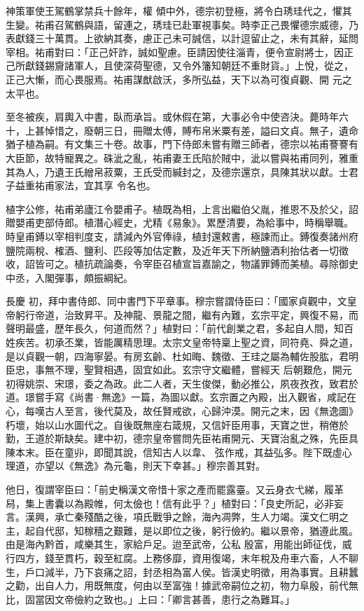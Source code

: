 \begin{pinyinscope}
 神策軍使王駕鶴掌禁兵十餘年，權
 傾中外，德宗初登極，將令白琇珪代之，懼其生變。祐甫召駕鶴與語，留連之，琇珪已赴軍視事矣。時李正己畏懼德宗威德，乃表獻錢三十萬貫。上欲納其奏，慮正己未可誠信，以計逗留止之，未有其辭，延問宰相。祐甫對曰：「正己奸詐，誠如聖慮。臣請因使往淄青，便令宣尉將士，因正己所獻錢錫齎諸軍人，且使深荷聖德，又令外籓知朝廷不重財貨。」上悅，從之，正己大慚，而心畏服焉。祐甫謀猷啟沃，多所弘益，天下以為可復貞觀、開
 元之太平也。



 至冬被疾，肩輿入中書，臥而承旨。或休假在第，大事必令中使咨決。薨時年六十，上甚悼惜之，廢朝三日，冊贈太傅，賻布帛米粟有差，謚曰文貞。無子，遺命猶子植為嗣。有文集三十卷。故事，門下侍郎未嘗有贈三師者，德宗以祐甫謇謇有大臣節，故特寵異之。硃泚之亂，祐甫妻王氏陷於賊中，泚以嘗與祐甫同列，雅重其為人，乃遺王氏繒帛菽粟，王氏受而緘封之，及德宗還京，具陳其狀以獻。士君子益重祐甫家法，宜其享
 令名也。



 植字公修，祐甫弟廬江令嬰甫子。植既為相，上言出繼伯父胤，推恩不及於父，詔贈嬰甫吏部侍郎。植潛心經史，尤精《易象》。累歷清要，為給事中，時稱舉職。時皇甫鎛以宰相判度支，請減內外官俸祿，植封還敕書，極諫而止。鎛復奏諸州府鹽院兩稅、榷酒、鹽利、匹段等加估定數，及近年天下所納鹽酒利抬估者一切徵收，詔皆可之。植抗疏論奏，令宰臣召植宣旨嘉諭之，物議罪鎛而美植。尋除御史中丞，入閣彈事，頗振綱紀。



 長慶
 初，拜中書侍郎、同中書門下平章事。穆宗嘗謂侍臣曰：「國家貞觀中，文皇帝躬行帝道，治致昇平。及神龍、景龍之間，繼有內難，玄宗平定，興復不易，而聲明最盛，歷年長久，何道而然？」植對曰：「前代創業之君，多起自人間，知百姓疾苦。初承丕業，皆能厲精思理。太宗文皇帝特稟上聖之資，同符堯、舜之道，是以貞觀一朝，四海寧晏。有房玄齡、杜如晦、魏徵、王珪之屬為輔佐股肱，君明臣忠，事無不理，聖賢相遇，固宜如此。玄宗守文繼體，嘗經天
 后朝艱危，開元初得姚崇、宋璟，委之為政。此二人者，天生俊傑，動必推公，夙夜孜孜，致君於道。璟嘗手寫《尚書·無逸》一篇，為圖以獻。玄宗置之內殿，出入觀省，咸記在心，每嘆古人至言，後代莫及，故任賢戒欲，心歸沖漠。開元之末，因《無逸圖》朽壞，始以山水圖代之。自後既無座右箴規，又信奸臣用事，天寶之世，稍倦於勤，王道於斯缺矣。建中初，德宗皇帝嘗問先臣祐甫開元、天寶治亂之殊，先臣具陳本末。臣在童丱，即聞其說，信知古人以韋、
 弦作戒，其益弘多。陛下既虛心理道，亦望以《無逸》為元龜，則天下幸甚。」穆宗善其對。



 他日，復謂宰臣曰：「前史稱漢文帝惜十家之產而罷露臺。又云身衣弋綈，履革舄，集上書囊以為殿帷，何太儉也！信有此乎？」植對曰：「良史所記，必非妄言。漢興，承亡秦殘酷之後，項氏戰爭之餘，海內凋弊，生人力竭。漢文仁明之主，起自代邸，知稼穡之艱難，是以即位之後，躬行儉約。繼以景帝，猶遵此風。由是海內黔首，咸樂其生，家給戶足。迨至武帝，公私
 殷富，用能出師征伐，威行四方，錢至貫朽，穀至紅腐。上務侈靡，資用復竭，末年稅及舟車六畜，人不聊生，戶口減半，乃下哀痛之詔，封丞相為富人侯。皆漢史明徵，用為事實。且耕蠶之勸，出自人力，用既無度，何由以至富強！據武帝嗣位之初，物力阜殷，前代無比，固當因文帝儉約之致也。」上曰：「卿言甚善，患行之為難耳。」




\end{pinyinscope}
